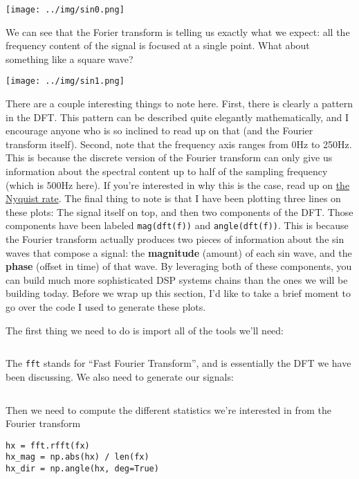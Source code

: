 \documentclass[12pt]{article}
\begin{document}
\texttt{[image: ../img/sin0.png]}

We can see that the Forier transform
is telling us exactly what we expect:
all the frequency content of the signal is
focused at a single point.
What about something like a square wave?

\texttt{[image: ../img/sin1.png]}

There are a couple interesting things to note here.
First, there is clearly a pattern in the DFT.
This pattern can be described quite elegantly mathematically,
and I encourage anyone who is so inclined to read up on
that (and the Fourier transform itself).
Second,
note that the frequency axis ranges from 0Hz to 250Hz.
This is because the discrete version of the Fourier transform can
only give us information about the spectral content up to half
of the sampling frequency (which is 500Hz here).
If you're interested in why this is the case,
read up on
\href{https://en.wikipedia.org/wiki/Nyquist_rate}{the Nyquist rate}.
The final thing to note is that I have been plotting
three lines on these plots:
The signal itself on top,
and then two components of the DFT.
Those components have been labeled
\texttt{mag(dft(f))}
and
\texttt{angle(dft(f))}.
This is because the Fourier transform actually produces
two pieces of information
about the sin waves that compose a signal:
the \textbf{magnitude} (amount) of each sin wave,
and the \textbf{phase} (offset in time) of that wave.
By leveraging both of these components,
you can build much more sophisticated DSP systems chains
than the ones we will be building today.
Before we wrap up this section,
I'd like to take a brief moment to
go over the code I used to generate these plots.

The first thing we need to do is import all of the tools we'll need:

\inputminted[firstline=1,lastline=4]{python}{"../example_signals.py"}

The \texttt{fft} stands for ``Fast Fourier Transform'',
and is essentially the DFT we have been discussing.
We also need to generate our signals:

\inputminted[firstline=47,lastline=49]{python}{"../example_signals.py"}

Then we need to compute the different statistics we're interested in from
the Fourier transform

\begin{verbatim}
hx = fft.rfft(fx)
hx_mag = np.abs(hx) / len(fx)
hx_dir = np.angle(hx, deg=True)
\end{verbatim}
\end{document}
